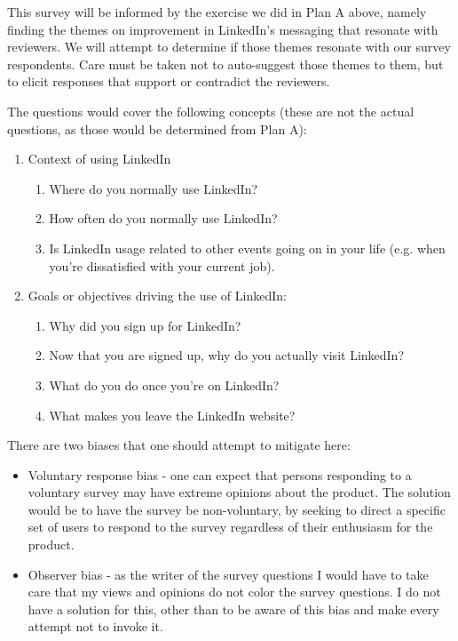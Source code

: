 \documentclass[
	letterpaper, %
]{jdf}
\begin{document}
This survey will be informed by the exercise we did in Plan A above, namely finding the themes on improvement in LinkedIn's messaging that resonate with reviewers. We will attempt to determine if those themes resonate with our survey respondents. Care must be taken not to auto-suggest those themes to them, but to elicit responses that support or contradict the reviewers.

The questions would cover the following concepts (these are not the actual questions, as those would be determined from Plan A):
\begin{enumerate}
    \item Context of using LinkedIn
    \begin{enumerate}
        \item Where do you normally use LinkedIn?
        \item How often do you normally use LinkedIn?
        \item Is LinkedIn usage related to other events going on in your life (e.g. when you're dissatisfied with your current job).
    \end{enumerate}
    \item Goals or objectives driving the use of LinkedIn:
    \begin{enumerate}
        \item Why did you sign up for LinkedIn?
        \item Now that you are signed up, why do you actually visit LinkedIn?
        \item What do you do once you're on LinkedIn?
        \item What makes you leave the LinkedIn website?
    \end{enumerate}
\end{enumerate}

There are two biases that one should attempt to mitigate here:
\begin{itemize}
    \item Voluntary response bias - one can expect that persons responding to a voluntary survey may have extreme opinions about the product. The solution would be to have the survey be non-voluntary, by seeking to direct a specific set of users to respond to the survey regardless of their enthusiasm for the product.
    \item Observer bias - as the writer of the survey questions I would have to take care that my views and opinions do not color the survey questions. I do not have a solution for this, other than to be aware of this bias and make every attempt not to invoke it.
\end{itemize}
\end{document}
